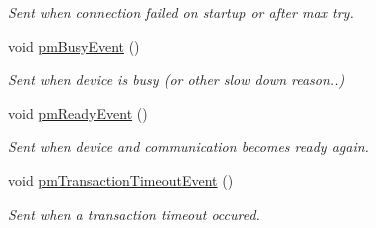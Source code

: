 \begin{DoxyCompactItemize}
\begin{DoxyCompactList}\small\item\em Sent when connection failed on startup or after max try. \end{DoxyCompactList}\item 
void \hyperlink{classmdt_port_manager_a5959d4025f4903eef0ea65c350f6f9b3}{pm\-Busy\-Event} ()
\begin{DoxyCompactList}\small\item\em Sent when device is busy (or other slow down reason..) \end{DoxyCompactList}\item 
void \hyperlink{classmdt_port_manager_aa23c17048773e345778e7d6393f630db}{pm\-Ready\-Event} ()
\begin{DoxyCompactList}\small\item\em Sent when device and communication becomes ready again. \end{DoxyCompactList}\item 
void \hyperlink{classmdt_port_manager_a0be3429f901fc9bf4adee196035d2cee}{pm\-Transaction\-Timeout\-Event} ()
\begin{DoxyCompactList}\small\item\em Sent when a transaction timeout occured. \end{DoxyCompactList}\end{DoxyCompactItemize}
